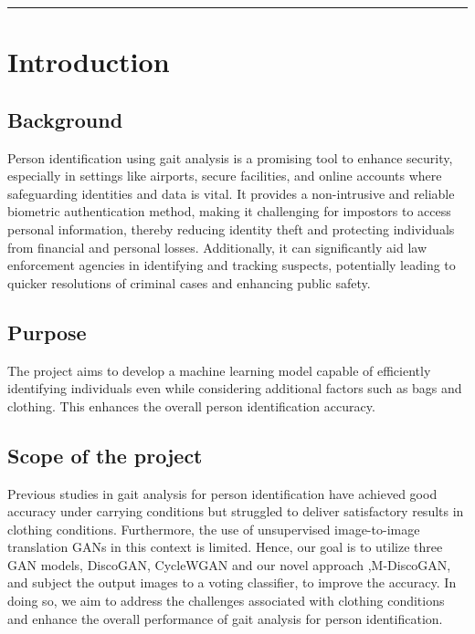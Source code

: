 \documentclass[12pt,a4paper]{article}
\begin{document}
   
\reviewtitle
\hrule

\section{Introduction}

\subsection{Background}
Person identification using gait analysis is a promising tool to enhance security, especially in settings like airports, secure facilities, and online accounts where safeguarding identities and data is vital. It provides a non-intrusive and reliable biometric authentication method, making it challenging for impostors to access personal information, thereby reducing identity theft and protecting individuals from financial and personal losses. Additionally, it can significantly aid law enforcement agencies in identifying and tracking suspects, potentially leading to quicker resolutions of criminal cases and enhancing public safety.

\subsection{Purpose}
The project aims to develop a machine learning model capable of efficiently identifying individuals even while considering additional factors such as bags and clothing. This enhances the overall person identification accuracy.

\subsection{Scope of the project}
Previous studies in gait analysis for person identification have achieved good accuracy under carrying conditions but struggled to deliver satisfactory results in clothing conditions. Furthermore, the use of unsupervised image-to-image translation GANs in this context is limited. Hence, our goal is to utilize three GAN models, DiscoGAN, CycleWGAN and our novel approach ,M-DiscoGAN, and subject the output images to a voting classifier, to improve the accuracy. In doing so, we aim to address the challenges associated with clothing conditions and enhance the overall performance of gait analysis for person identification.
\end{document}
